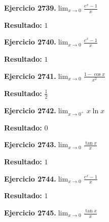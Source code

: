 \documentclass[10pt,a4paper]{article}
\begin{document}
\newpage
\begin{ejbox}
\textbf{Ejercicio 2739.}\quad $\lim_{x\to 0} \frac{e^x-1}{x}$
\end{ejbox}

\begin{solbox}
\textbf{Resultado:} \(\displaystyle 1\)
\end{solbox}

\begin{ejbox}
\textbf{Ejercicio 2740.}\quad $\lim_{x\to 0} \frac{e^x-1}{x}$
\end{ejbox}

\begin{solbox}
\textbf{Resultado:} \(\displaystyle 1\)
\end{solbox}

\begin{ejbox}
\textbf{Ejercicio 2741.}\quad $\lim_{x\to 0} \frac{1-\cos x}{x^2}$
\end{ejbox}

\begin{solbox}
\textbf{Resultado:} \(\displaystyle \frac{1}{2}\)
\end{solbox}

\newpage
\begin{ejbox}
\textbf{Ejercicio 2742.}\quad $\lim_{x\to 0^+} x\ln x$
\end{ejbox}

\begin{solbox}
\textbf{Resultado:} \(\displaystyle 0\)
\end{solbox}

\begin{ejbox}
\textbf{Ejercicio 2743.}\quad $\lim_{x\to 0} \frac{\tan x}{x}$
\end{ejbox}

\begin{solbox}
\textbf{Resultado:} \(\displaystyle 1\)
\end{solbox}

\begin{ejbox}
\textbf{Ejercicio 2744.}\quad $\lim_{x\to 0} \frac{e^x-1}{x}$
\end{ejbox}

\begin{solbox}
\textbf{Resultado:} \(\displaystyle 1\)
\end{solbox}

\newpage
\begin{ejbox}
\textbf{Ejercicio 2745.}\quad $\lim_{x\to 0} \frac{\tan x}{x}$
\end{ejbox}
\end{document}
